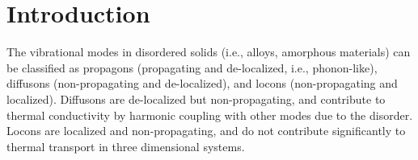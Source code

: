 \documentclass[aps,prb,onecolumn,preprint,superscriptaddress,footinbib,amsmath,amssymb,floatfix]{revtex4}
\begin{document}
\section{\label{S:Introduction}Introduction}


The vibrational modes in disordered solids (i.e., alloys, 
amorphous materials) can be 
classified as propagons (propagating and de-localized, 
i.e., phonon-like), diffusons (non-propagating and 
de-localized), and locons (non-propagating and localized).
\cite{allen_thermal_1993,allen_diffusons_1999} 
Diffusons are de-localized but non-propagating, 
and contribute to thermal conductivity by harmonic coupling 
with other modes due to the disorder. Locons are 
localized and non-propagating, and do not contribute 
significantly 
to thermal transport in three dimensional systems.
\cite{leitner_vibrational_2001}
\end{document}
